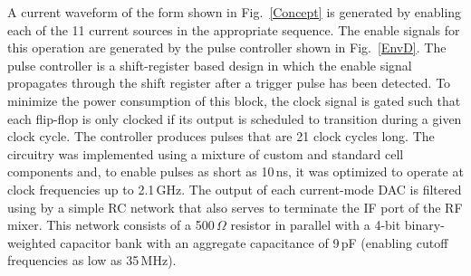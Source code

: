 \documentclass[journal]{IEEEtran}
\newcommand{\CR}[1]{{\color{black}#1}}
\begin{document}
A current waveform of the form shown in Fig.~\ref{Concept} is generated by enabling each of the 11 current sources in the appropriate sequence. The  enable signals for this operation are generated by the pulse controller shown in Fig.~\ref{EnvD}. The pulse controller is a shift-register based design in which the enable signal propagates through the shift register after a trigger pulse has been detected. To minimize the power consumption of this block, the clock signal is gated such that each flip-flop is only clocked if its output is \CR{scheduled} to transition during a given clock cycle. \CR{The controller produces pulses that are 21 clock cycles long. The circuitry was implemented using a mixture of custom and standard cell components and, to enable pulses as short as 10\,ns, it was optimized to operate at clock frequencies up to 2.1\,GHz. The output of each current-mode DAC is filtered using by a simple RC network that also serves to terminate the IF port of the RF mixer. This network consists of a 500\,$\Omega$ resistor in parallel with a 4-bit binary-weighted capacitor bank with an aggregate capacitance of 9\,pF (enabling cutoff frequencies as low as 35\,MHz).} %
\end{document}
